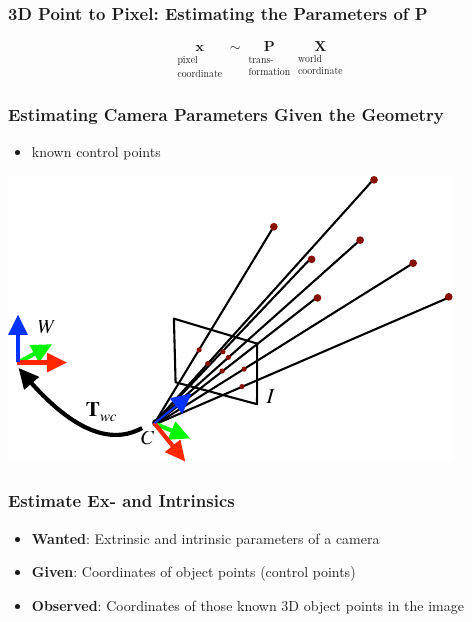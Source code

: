\begin{frame}
  \frametitle{3D Point to Pixel: Estimating the Parameters of P}
  \begin{equation*}
    \underset{\substack{\text{pixel}\\ \text{coordinate}}}{\mathbf{x}} \sim \underset{\substack{\text{trans-}\\ \text{formation}}}{\mathbf{P}}
    \underset{\substack{\text{world}\\ \text{coordinate}}}{\mathbf{X}}
  \end{equation*}  
\end{frame}

\begin{frame}
  \frametitle{Estimating Camera Parameters Given the Geometry}
  \begin{itemize}
    \item known control points
  \end{itemize}
  \begin{center}
    \includegraphics[width=0.5\columnwidth]{./images/dlt_3d_2d.pdf}
  \end{center}
\end{frame}

\begin{frame}
  \frametitle{Estimate Ex- and Intrinsics}
  \begin{itemize}
    \item \textbf{Wanted}: Extrinsic and intrinsic parameters of a camera
    \item \textbf{Given}: Coordinates of object points (control points)
    \item \textbf{Observed}: Coordinates of those known 3D object points in the image
  \end{itemize}
\end{frame}

